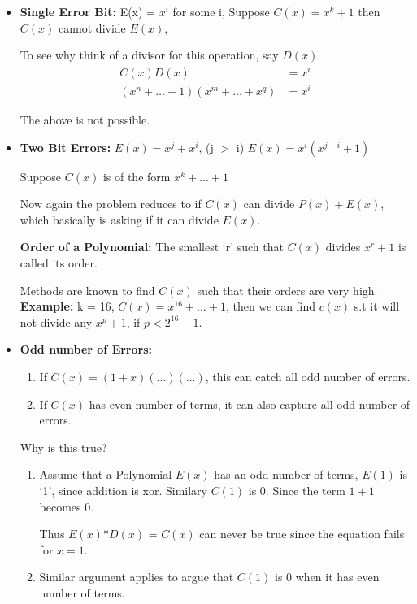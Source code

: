 \documentclass[12pt]{article}
\begin{document}
\begin{itemize}
    \item \textbf{Single Error Bit:} E(x) = \(x^i\) for some i,
    Suppose \(C(x) = x^k + 1\)
    then \(C(x)\) cannot divide \(E(x)\), 

    To see why think of a divisor for this operation, say \(D(x)\)
    \begin{align}
        C(x) D(x) &= x^i \\
        (x^n + \dots + 1)(x^m + \dots + x^q) &= x^i
    \end{align}

    The above is not possible.

    \item \textbf{Two Bit Errors:} 
    \(E(x) = x^j + x^i\), (j $>$ i)
    \(E(x) = x^i(x^{j-i} + 1)\)
    
    Suppose \(C(x)\) is of the form \(x^k + \dots + 1\)

    Now again the problem reduces to if \(C(x)\) can divide \(P(x) + E(x)\), which 
    basically is asking if it can divide \(E(x)\). 

    \textbf{Order of a Polynomial:} The smallest `r' such that \(C(x)\) divides \(x^r + 1\) is called its order. 
    
    Methods are known to find \(C(x)\) such that their orders are very high. 
    \textbf{Example:} k = 16, \(C(x) = x^{16} + \dots + 1\), then we can find \(c(x)\) s.t it will
    not divide any \(x^p + 1\), if \(p < 2^{16} - 1\). 

    \item \textbf{Odd number of Errors:}
    \begin{enumerate}
        \item If \(C(x) = (1+x)(...)(...)\), this can catch all odd number of errors.
        \item If \(C(x)\) has even number of terms, it can also capture all odd number of errors. 
    \end{enumerate}
    Why is this true?
    \begin{enumerate}
        \item Assume that a Polynomial \(E(x)\) has an odd number of terms, \(E(1)\) is `1', since addition is xor.
        Similary \(C(1)\) is 0. Since the term \(1 + 1\) becomes 0. 

        Thus \(E(x)\)*\(D(x)\) = \(C(x)\) can never be true since the equation fails for \(x = 1\).
        
        \item Similar argument applies to argue that \(C(1)\) is 0 when it has even number of terms.  
    \end{enumerate}


\end{itemize}
\end{document}

